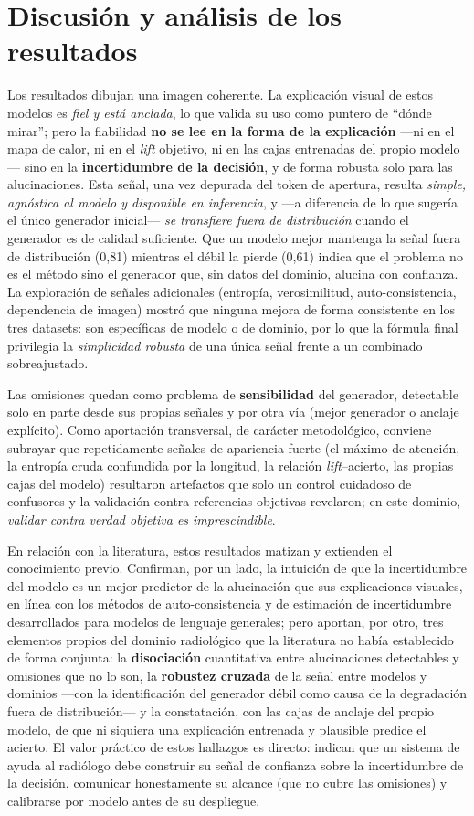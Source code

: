 \section{Discusión y análisis de los resultados}
Los resultados dibujan una imagen coherente. La explicación visual de estos modelos es \emph{fiel y
está anclada}, lo que valida su uso como puntero de ``dónde mirar''; pero la fiabilidad \textbf{no se
lee en la forma de la explicación} —ni en el mapa de calor, ni en el \emph{lift} objetivo, ni en las
cajas entrenadas del propio modelo— sino en la \textbf{incertidumbre de la decisión}, y de forma
robusta solo para las alucinaciones. Esta señal, una vez depurada del token de apertura, resulta
\emph{simple, agnóstica al modelo y disponible en inferencia}, y —a diferencia de lo que sugería el
único generador inicial— \emph{se transfiere fuera de distribución} cuando el generador es de calidad
suficiente. Que un modelo mejor mantenga la señal fuera de distribución (0,81) mientras el débil la
pierde (0,61) indica que el problema no es el método sino el generador que, sin datos del dominio,
alucina con confianza. La exploración de señales adicionales (entropía, verosimilitud,
auto-consistencia, dependencia de imagen) mostró que ninguna mejora de forma consistente en los tres
datasets: son específicas de modelo o de dominio, por lo que la fórmula final privilegia la
\emph{simplicidad robusta} de una única señal frente a un combinado sobreajustado.

Las omisiones quedan como problema de \textbf{sensibilidad} del generador, detectable solo en parte
desde sus propias señales y por otra vía (mejor generador o anclaje explícito). Como aportación
transversal, de carácter metodológico, conviene subrayar que repetidamente señales de apariencia
fuerte (el máximo de atención, la entropía cruda confundida por la longitud, la relación
\emph{lift}--acierto, las propias cajas del modelo) resultaron artefactos que solo un control
cuidadoso de confusores y la validación contra referencias objetivas revelaron; en este dominio,
\emph{validar contra verdad objetiva es imprescindible}.

En relación con la literatura, estos resultados matizan y extienden el conocimiento previo. Confirman,
por un lado, la intuición de que la incertidumbre del modelo es un mejor predictor de la alucinación
que sus explicaciones visuales, en línea con los métodos de auto-consistencia y de estimación de
incertidumbre desarrollados para modelos de lenguaje generales; pero aportan, por otro, tres elementos
propios del dominio radiológico que la literatura no había establecido de forma conjunta: la
\textbf{disociación} cuantitativa entre alucinaciones detectables y omisiones que no lo son, la
\textbf{robustez cruzada} de la señal entre modelos y dominios —con la identificación del generador
débil como causa de la degradación fuera de distribución— y la constatación, con las cajas de anclaje
del propio modelo, de que ni siquiera una explicación entrenada y plausible predice el acierto. El
valor práctico de estos hallazgos es directo: indican que un sistema de ayuda al radiólogo debe
construir su señal de confianza sobre la incertidumbre de la decisión, comunicar honestamente su
alcance (que no cubre las omisiones) y calibrarse por modelo antes de su despliegue.

